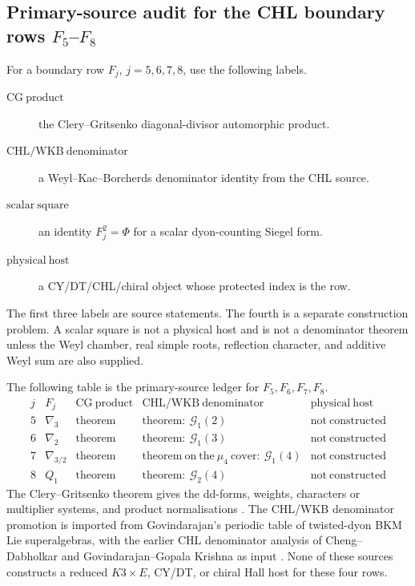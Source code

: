 \subsection{\texorpdfstring{Primary-source audit for the CHL boundary rows \(F_5\)--\(F_8\)}
{Primary-source audit for the CHL boundary rows F5-F8}}

\begin{definition}
For a boundary row \(F_j\), \(j=5,6,7,8\), use the following labels.
\begin{description}
\item[\(\mathrm{CG\ product}\)] the Clery--Gritsenko diagonal-divisor
automorphic product.
\item[\(\mathrm{CHL/WKB\ denominator}\)] a Weyl--Kac--Borcherds
denominator identity from the CHL source.
\item[\(\mathrm{scalar\ square}\)] an identity \(F_j^2=\Phi\) for a scalar
dyon-counting Siegel form.
\item[\(\mathrm{physical\ host}\)] a CY/DT/CHL/chiral object whose protected
index is the row.
\end{description}
The first three labels are source statements.  The fourth is a separate
construction problem.  A scalar square is not a physical host and is not a
denominator theorem unless the Weyl chamber, real simple roots, reflection
character, and additive Weyl sum are also supplied.
\end{definition}

\begin{theorem}
\label{thm:chl-boundary-primary-source-ledger}
The following table is the primary-source ledger for \(F_5,F_6,F_7,F_8\).
\[
\begin{array}{c|c|c|c|c}
j&F_j&\mathrm{CG\ product}&\mathrm{CHL/WKB\ denominator}&
\mathrm{physical\ host}\\ \hline
5&\nabla_3&\mathrm{theorem}&\mathrm{theorem:\ }\mathcal G_1(2)&
\mathrm{not\ constructed}\\
6&\nabla_2&\mathrm{theorem}&\mathrm{theorem:\ }\mathcal G_1(3)&
\mathrm{not\ constructed}\\
7&\nabla_{3/2}&\mathrm{theorem}&
\mathrm{theorem\ on\ the\ }\mu_4\mathrm{\ cover:\ }\mathcal G_1(4)&
\mathrm{not\ constructed}\\
8&Q_1&\mathrm{theorem}&\mathrm{theorem:\ }\mathcal G_2(4)&
\mathrm{not\ constructed}
\end{array}
\]
The Clery--Gritsenko theorem gives the dd-forms, weights, characters or
multiplier systems, and product normalisations \cite{GC}.  The CHL/WKB
denominator promotion is imported from Govindarajan's periodic table of
twisted-dyon BKM Lie superalgebras, with the earlier CHL denominator analysis
of Cheng--Dabholkar and Govindarajan--Gopala Krishna as input
\cite{CD09BKM,GK09CHL,GK10Composite,Gov11BKM}.  None of these sources
constructs a reduced \(K3\times E\), CY/DT, or chiral Hall host for these four
rows.
\end{theorem}

